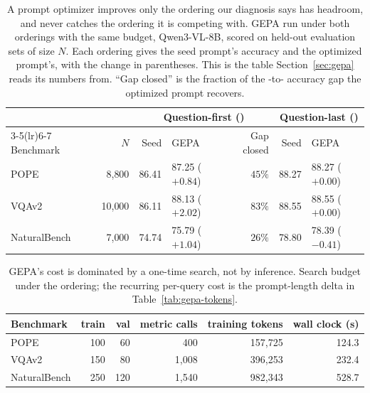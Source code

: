 \begin{table}[h]
\caption{A prompt optimizer improves only the ordering our diagnosis says has
headroom, and never catches the ordering it is competing with. GEPA run under
both orderings with the same budget, Qwen3-VL-8B, scored on held-out evaluation
sets of size $N$. Each ordering gives the seed prompt's accuracy and the
optimized prompt's, with the change in parentheses. This is the table
Section~\ref{sec:gepa} reads its numbers from. ``Gap closed'' is the
fraction of the \sti{}-to-\sit{} accuracy gap the optimized \sti{} prompt
recovers.}
\label{tab:gepa}
\begin{center}
\small
\setlength{\tabcolsep}{4pt}
\begin{tabular}{lrrlrrl}
\toprule
 & & \multicolumn{3}{c}{Question-first (\sti{})} & \multicolumn{2}{c}{Question-last (\sit{})} \\
\cmidrule(lr){3-5}\cmidrule(lr){6-7}
Benchmark & $N$ & Seed & GEPA & Gap closed & Seed & GEPA \\
\midrule
POPE         &  8{,}800 & 86.41 & 87.25 ($+0.84$) & $45\%$ & 88.27 & 88.27 ($+0.00$) \\
VQAv2        & 10{,}000 & 86.11 & 88.13 ($+2.02$) & $83\%$ & 88.55 & 88.55 ($+0.00$) \\
NaturalBench &  7{,}000 & 74.74 & 75.79 ($+1.04$) & $26\%$ & 78.80 & 78.39 ($-0.41$) \\
\bottomrule
\end{tabular}
\end{center}
\end{table}

\begin{table}[h]
\caption{GEPA's cost is dominated by a one-time search, not by inference.
Search budget under the \sti{} ordering; the recurring per-query cost is the
prompt-length delta in Table~\ref{tab:gepa-tokens}.}
\label{tab:gepa-cost}
\begin{center}
\begin{tabular}{lrrrrr}
\toprule
Benchmark & train & val & metric calls & training tokens & wall clock (s) \\
\midrule
POPE         & 100 & 60 & 400 & 157{,}725 & 124.3 \\
VQAv2        & 150 & 80 & 1{,}008 & 396{,}253 & 232.4 \\
NaturalBench & 250 & 120 & 1{,}540 & 982{,}343 & 528.7 \\
\bottomrule
\end{tabular}
\end{center}
\end{table}

